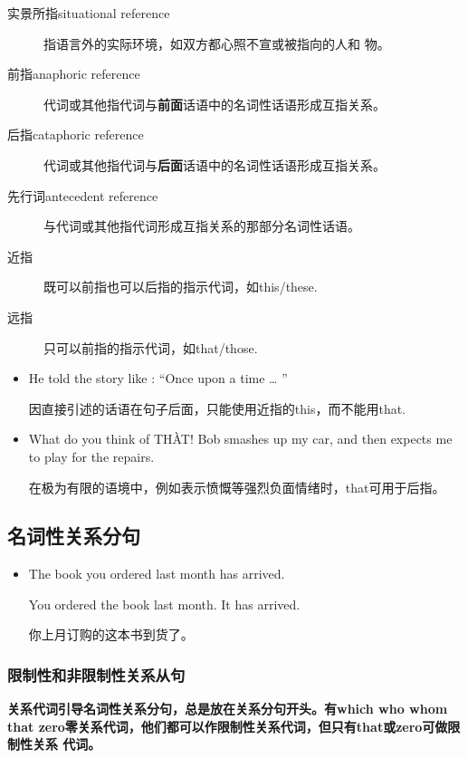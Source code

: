 \begin{description}
\item[实景所指situational reference] 指语言外的实际环境，如双方都心照不宣或被指向的人和
  物。
\item[前指anaphoric reference] 代词或其他指代词与\textbf{前面}话语中的名词性话语形成互指关系。
\item[后指cataphoric reference] 代词或其他指代词与\textbf{后面}话语中的名词性话语形成互指关系。
\item[先行词antecedent reference] 与代词或其他指代词形成互指关系的那部分名词性话语。
\item[近指] 既可以前指也可以后指的指示代词，如this/these.
\item[远指] 只可以前指的指示代词，如that/those.
\end{description}

\begin{itemize}

\item He told the story like : ``Once upon a time \ldots{} ''

  因直接引述的话语在句子后面，只能使用近指的this，而不能用that.

\item What do you think of TH\`{A}T! Bob smashes up my car, and then expects me to
  play for the repairs.

  在极为有限的语境中，例如表示愤慨等强烈负面情绪时，that可用于后指。
\end{itemize}

\subsection{名词性关系分句}

\begin{itemize}
\item The book  you ordered last month has arrived.

  You ordered the book last month. It has arrived.

  你上月订购的这本书到货了。
\end{itemize}

\subsubsection{限制性和非限制性关系从句}

\textbf{关系代词引导名词性关系分句，总是放在关系分句开头。有which who whom that
  zero零关系代词，他们都可以作限制性关系代词，但只有that或zero可做限制性关系
  代词。}

